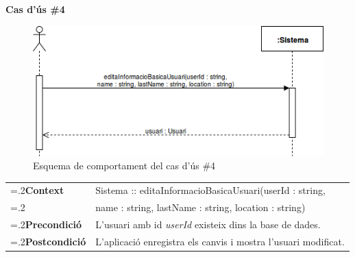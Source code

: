 \noindent\textbf{\large Cas d'ús \#4}\\
\begin{figure}[H]
\centering
\includegraphics[scale=0.6]{Figures/casdus_04.png}
\caption{Esquema de comportament del cas d'ús \#4}
\end{figure}
\begin{table}[h]
\noindent
\begin{tabularx}{\linewidth}{
>{\hsize=.2\hsize}X%
>{\hsize=0.8\hsize}X%
}
\textbf{Context} 		& Sistema :: editaInformacioBasicaUsuari(userId : string, \\
						& name : string, lastName : string, location : string) \\
\textbf{Precondició} 	& L'usuari amb id \textit{userId} existeix dins la base de dades. \\
\textbf{Postcondició}	& L'aplicació enregistra els canvis i mostra l'usuari modificat. \\
\end{tabularx}
\label{}
\end{table}

